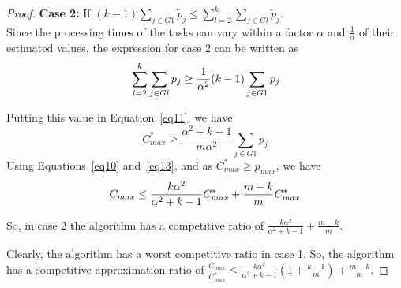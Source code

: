 \begin{proof}
   \textbf{Case 2:} If $(k-1)\sum_{j \in G1 }^{}{\tilde p_{j}} \leq \sum_{l=2}^{k}\sum_{j \in Gl }^{}{\tilde p_{j}}$. \\
   
   Since the processing times of the tasks can vary within a factor
   $\alpha$ and $\frac{1}{\alpha}$ of their estimated values, the
   expression for case 2 can be written as
   \begin{equation}{\nonumber}
     \sum_{l=2}^{k}\sum_{j \in Gl }^{}{ p_{j}} \geq \frac{1}{\alpha^2} (k-1)\sum_{j \in G1 }^{}{ p_{j}}
   \end{equation}
   
   Putting this value in Equation~\ref{eq11}, we have
   \begin{equation}\label{eq13}
     C_{max}^{*} \geq \frac{\alpha^2+k-1}{m\alpha^2}\sum_{j \in G1 }^{}{ p_{j}}
   \end{equation}
   Using Equations~\ref{eq10} and~\ref{eq13}, and as $C_{max}^{*} \geq p_{max}$, we have
   \begin{equation}{\nonumber}
     C_{max} \leq \frac{k\alpha^2}{\alpha^2+k-1}C_{max}^{*}+\frac{m-k}{m}C_{max}^{*}
   \end{equation}
   
   So, in case 2 the algorithm has a competitive ratio of
   $\frac{k\alpha^2}{\alpha^2+k-1}+\frac{m-k}{m}$.
 
   Clearly, the algorithm has a worst competitive ratio in case 1.  So,
   the algorithm has a competitive approximation ratio of
   $\frac{C_{max}}{C_{max}^{*}} \leq \frac{k\alpha^{2}}{\alpha^{2}+k-1}
   \left( 1+ {\frac{k-1}{m}} \right) + {\frac{m-k}{m}}$.
 \end{proof}
 
 
